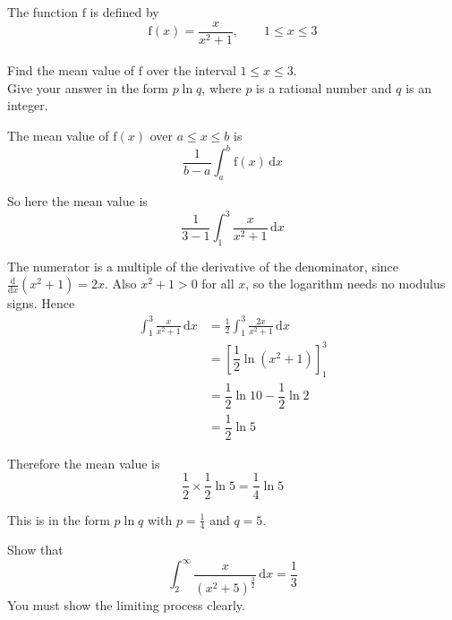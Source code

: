 \documentclass[leqno]{article}
\begin{document}
\djsFrontMatter
\begin{enumerate}[
  label=\textbf{\arabic*.},
  leftmargin=*,
  topsep=0pt,
  partopsep=0pt,
  parsep=0pt
]

\questionitem

The function $\mathrm{f}$ is defined by
\[\mathrm{f}(x) = \dfrac{x}{x^2+1}, \qquad 1 \le x \le 3\] \\
Find the mean value of $\mathrm{f}$ over the interval $1 \le x \le 3$. \\

Give your answer in the form $p\ln q$, where $p$ is a rational number and $q$ is an integer.  \\

\vspace*{10pt}

\begin{djsSolution}
The mean value of \(\mathrm{f}(x)\) over \(a\le x\le b\) is
\[
\dfrac{1}{b-a}\int_a^b \mathrm{f}(x)\,\mathrm{d}x
\]

So here the mean value is
\[
\frac{1}{3-1}\int_1^3 \frac{x}{x^2+1}\,\mathrm{d}x
\]

The numerator is a multiple of the derivative of the denominator, since \(\frac{\mathrm{d}}{\mathrm{d}x}\left(x^2+1\right)=2x\). Also \(x^2+1>0\) for all \(x\), so the logarithm needs no modulus signs. Hence
\begin{align*}
\int_1^3 \frac{x}{x^2+1}\,\mathrm{d}x &= \frac12\int_1^3 \frac{2x}{x^2+1}\,\mathrm{d}x\\
&= \left[\dfrac12\ln\left(x^2+1\right)\right]_1^3\\
&= \dfrac12\ln 10-\dfrac12\ln 2\\
&= \dfrac12\ln 5
\end{align*}

Therefore the mean value is
\[
\frac12\times\frac12\ln 5=\frac14\ln 5
\]

This is in the form \(p\ln q\) with \(p=\frac14\) and \(q=5\).
\end{djsSolution}

\newpage

\questionitem

Show that
\[\int_{2}^{\infty} \dfrac{x}{(x^{2}+5)^{\frac{3}{2}}}\,\mathrm{d}x = \dfrac{1}{3}\]
You must show the limiting process clearly.  \\


\end{enumerate}
\end{document}
